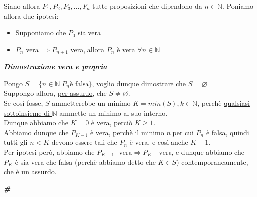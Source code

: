 \documentclass{article}
\theoremstyle{definition}
\newcommand{\cvd}{\begin{center} \textbf{\textit{\#}} \end{center}}
\begin{document}
Siano allora $P_1,P_2,P_3,...,P_n$ tutte proposizioni che dipendono da $n \in \mathbb{N}$.
Poniamo allora due ipotesi:
\begin{itemize}
    \item Supponiamo che $P_0$ sia \underline{vera}
\item $P_n$ vera $\Longrightarrow P_{n+1}$ vera, allora $P_n$ è vera $\forall n \in \mathbb{N}$
\end{itemize}
\begin{center}
    \textbf{\textit{Dimostrazione vera e propria}}
\end{center}
Pongo $S=\{n \in \mathbb{N} | P_n \mbox{è falsa}\}$, voglio dunque dimostrare che $S = \varnothing$
\\ Suppongo allora, \underline{per assurdo}, che $S \neq \varnothing$.
\\ Se così fosse, $S$ ammetterebbe un minimo $K=min(S), k \in \mathbb{N}$, perchè \underline{qualsiasi sottoinsieme di $\mathbb{N}$} ammette un minimo al suo interno.
\\
Dunque abbiamo che $K=0$ è vera, perciò $K \geqslant 1$.
\\
Abbiamo dunque che $P_{K-1}$ è vera, perchè il minimo $n$ per cui $P_n$ è falsa, quindi tutti gli $n < K$ devono essere tali che $P_n$ è vera, e così anche $K-1$.
\\
Per ipotesi però, abbiamo che $P_{K-1} \,\,\,\, \mbox{vera} \Longrightarrow P_K \,\,\,\,\,\, \mbox{vera}$, e dunque abbiamo che $P_K$ è sia vera che falsa (perchè abbiamo detto che $K \in S$) contemporaneamente, che è un assurdo.
\cvd
\end{document}
